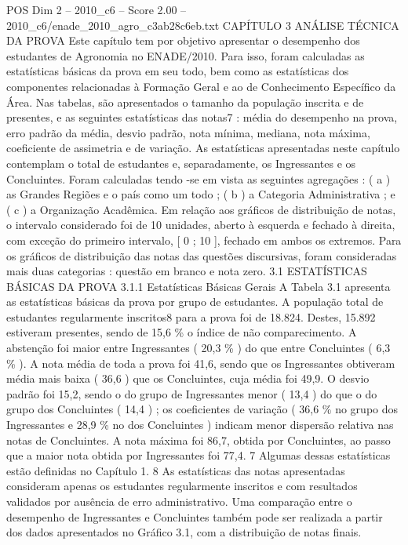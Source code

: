 \begin{textsample}{POS Dim 2 – 2010\_c6 – Score 2.00 – 2010\_c6/enade\_2010\_agro\_c3ab28c6eb.txt}  \label{ex:f2_pos_183}
CAPÍTULO 3 ANÁLISE TÉCNICA DA PROVA Este capítulo tem por objetivo apresentar o desempenho dos estudantes de Agronomia no ENADE/2010.
Para isso, foram calculadas as estatísticas básicas da prova em seu todo, bem como as estatísticas dos componentes relacionadas à Formação Geral e ao de Conhecimento Específico da Área.
Nas tabelas, são apresentados o tamanho da população inscrita e de presentes, e as seguintes estatísticas das notas7 : média do desempenho na prova, erro padrão da média, desvio padrão, nota mínima, mediana, nota máxima, coeficiente de assimetria e de variação.
As estatísticas apresentadas neste capítulo contemplam o total de estudantes e, separadamente, os Ingressantes e os Concluintes.
Foram calculadas tendo -se em vista as seguintes agregações : ( a ) as Grandes Regiões e o país como um todo ; ( b ) a Categoria Administrativa ; e ( c ) a Organização Acadêmica.
Em relação aos gráficos de distribuição de notas, o intervalo considerado foi de 10 unidades, aberto à esquerda e fechado à direita, com exceção do primeiro intervalo, [ 0 ; 10 ], fechado em ambos os extremos.
Para os gráficos de distribuição das notas das questões discursivas, foram consideradas mais duas categorias : questão em branco e nota zero. 3.1 ESTATÍSTICAS BÁSICAS DA PROVA 3.1.1 Estatísticas Básicas Gerais A Tabela 3.1 apresenta as estatísticas básicas da prova por grupo de estudantes.
A população total de estudantes regularmente inscritos8 para a prova foi de 18.824.
Destes, 15.892 estiveram presentes, sendo de 15,6 \% o índice de não comparecimento.
A abstenção foi maior entre Ingressantes ( 20,3 \% ) do que entre Concluintes ( 6,3 \% ).
A nota média de toda a prova foi 41,6, sendo que os Ingressantes obtiveram média mais baixa ( 36,6 ) que os Concluintes, cuja média foi 49,9.
O desvio padrão foi 15,2, sendo o do grupo de Ingressantes menor ( 13,4 ) do que o do grupo dos Concluintes ( 14,4 ) ; os coeficientes de variação ( 36,6 \% no grupo dos Ingressantes e 28,9 \% no dos Concluintes ) indicam menor dispersão relativa nas notas de Concluintes.
A nota máxima foi 86,7, obtida por Concluintes, ao passo que a maior nota obtida por Ingressantes foi 77,4. 7 Algumas dessas estatísticas estão definidas no Capítulo 1. 8 As estatísticas das notas apresentadas consideram apenas os estudantes regularmente inscritos e com resultados validados por ausência de erro administrativo.
Uma comparação entre o desempenho de Ingressantes e Concluintes também pode ser realizada a partir dos dados apresentados no Gráfico 3.1, com a distribuição de notas finais.

\end{textsample}
